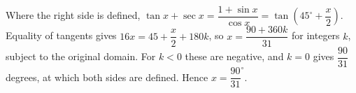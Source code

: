 Where the right side is defined, $\tan x + \sec x = \dfrac{1+\sin x}{\cos x} = \tan (45^\circ + \dfrac{x}{2})$. Equality of tangents gives $16 x = 45 + \dfrac{x}{2} + 180 k$, so $x=\dfrac{90+360k}{31}$ for integers $k$, subject to the original domain. For $k<0$ these are negative, and $k=0$ gives $\dfrac{90}{31}$ degrees, at which both sides are defined. Hence $\boxed{x=\dfrac{90}{31}^\circ}$.
